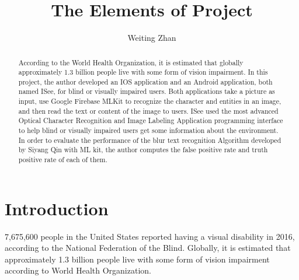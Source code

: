 \documentclass[11pt]{ucscthesis}
\begin{document}

\title{The Elements of Project}
\author{Weiting Zhan}




\begin{frontmatter}

\maketitle


\tableofcontents
\listoffigures

\begin{abstract}
According to the World Health Organization, it is estimated that globally approximately 1.3 billion people live with some form of vision impairment. In this project, the author developed an IOS application and an Android application, both named ISee, for blind or visually impaired users. Both applications take a picture as input, use Google Firebase MLKit to recognize the character and entities in an image, and then read the text or content of the image to users. ISee used the most advanced Optical Character Recognition and Image Labeling Application programming interface to help blind or visually impaired users get some information about the environment. In order to evaluate the performance of the blur text recognition Algorithm developed by Siyang Qin with ML kit, the author computes the false positive rate and truth positive rate of each of them.

\end{abstract}




\end{frontmatter}



\chapter{Introduction}
 7,675,600 people in the United States reported having a visual disability in 2016, according to the National Federation of the Blind\cite{USBlindStatistics}. Globally, it is estimated that approximately 1.3 billion people live with some form of vision impairment according to World Health Organization\cite{WHOlindStatistics}.
\end{document}
